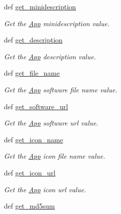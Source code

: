 \begin{CompactItemize}
def \hyperlink{classwinsollib_1_1App_62522ade216eaeb84231e4ddd5508dd1}{get\_\-minidescription}
\begin{CompactList}\small\item\em Get the \hyperlink{classwinsollib_1_1App}{App} minidescription value. \item\end{CompactList}\item 
def \hyperlink{classwinsollib_1_1App_a124553446cdb7443fcfcd418b5be5cc}{get\_\-description}
\begin{CompactList}\small\item\em Get the \hyperlink{classwinsollib_1_1App}{App} description value. \item\end{CompactList}\item 
def \hyperlink{classwinsollib_1_1App_304caf3feb3151499528f5d77ef0b318}{get\_\-file\_\-name}
\begin{CompactList}\small\item\em Get the \hyperlink{classwinsollib_1_1App}{App} software file name value. \item\end{CompactList}\item 
def \hyperlink{classwinsollib_1_1App_78e363a0bbbae0c96bfec25b7ff91137}{get\_\-software\_\-url}
\begin{CompactList}\small\item\em Get the \hyperlink{classwinsollib_1_1App}{App} software url value. \item\end{CompactList}\item 
def \hyperlink{classwinsollib_1_1App_42df165647447b8ce9a48924f298fa6b}{get\_\-icon\_\-name}
\begin{CompactList}\small\item\em Get the \hyperlink{classwinsollib_1_1App}{App} icon file name value. \item\end{CompactList}\item 
def \hyperlink{classwinsollib_1_1App_b413c05e7b685dc3c2ba6c90f47586b6}{get\_\-icon\_\-url}
\begin{CompactList}\small\item\em Get the \hyperlink{classwinsollib_1_1App}{App} icon url value. \item\end{CompactList}\item 
def \hyperlink{classwinsollib_1_1App_8668edffb85d5c7cda670d16b3d1f761}{get\_\-md5sum}

\end{CompactItemize}
